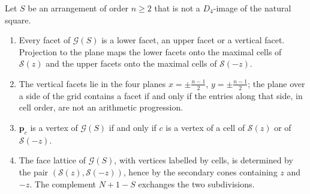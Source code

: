 \begin{proposition}
\label{prop:subdivisions}
Let $S$ be an arrangement of order $n\ge2$ that is not a $D_4$-image of the natural square.
\begin{enumerate}
\item Every facet of $\mathcal G(S)$ is a lower facet, an upper facet or a vertical facet. Projection to the plane maps the lower facets onto the maximal cells of $\mathcal S(z)$ and the upper facets onto the maximal cells of $\mathcal S(-z)$.
\item The vertical facets lie in the four planes $x=\pm\frac{n-1}2$, $y=\pm\frac{n-1}2$; the plane over a side of the grid contains a facet if and only if the entries along that side, in cell order, are not an arithmetic progression.
\item $\mathbf p_c$ is a vertex of $\mathcal G(S)$ if and only if $c$ is a vertex of a cell of $\mathcal S(z)$ or of $\mathcal S(-z)$.
\item The face lattice of $\mathcal G(S)$, with vertices labelled by cells, is determined by the pair $(\mathcal S(z),\mathcal S(-z))$, hence by the secondary cones containing $z$ and $-z$. The complement $N+1-S$ exchanges the two subdivisions.
\end{enumerate}
\end{proposition}

